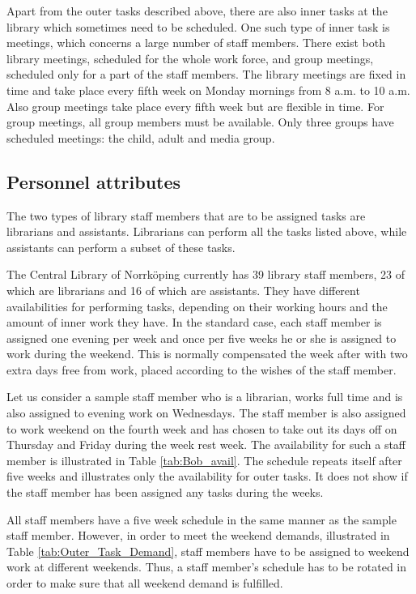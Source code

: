 Apart from the outer tasks described above, there are also inner tasks at the library which sometimes need to be scheduled. One such type of inner task is meetings, which concerns a large number of staff members. There exist both library meetings, scheduled for the whole work force, and group meetings, scheduled only for a part of the staff members. The library meetings are fixed in time and take place every fifth week on Monday mornings from 8 a.m. to 10 a.m. Also group meetings take place every fifth week but are flexible in time. For group meetings, all group members must be available. Only three groups have scheduled meetings: the child, adult and media group.

\subsection{Personnel attributes}

The two types of library staff members that are to be assigned tasks are librarians and assistants. Librarians can perform all the tasks listed above, while assistants can perform a subset of these tasks.

The Central Library of Norrköping currently has 39 library staff members, 23 of which are librarians and 16 of which are assistants. They have different availabilities for performing tasks, depending on their working hours and the amount of inner work they have. In the standard case, each staff member is assigned one evening per week and once per five weeks he or she is assigned to work during the weekend. This is normally compensated the week after with two extra days free from work, placed according to the wishes of the staff member.

Let us consider a sample staff member who is a librarian, works full time and is also assigned to evening work on Wednesdays. The staff member is also assigned to work weekend on the fourth week and has chosen to take out its days off on Thursday and Friday during the week rest week. The availability for such a staff member is illustrated in Table \ref{tab:Bob_avail}. The schedule repeats itself after five weeks and illustrates only the availability for outer tasks. It does not show if the staff member has been assigned any tasks during the weeks.

All staff members have a five week schedule in the same manner as the sample staff member. However, in order to meet the weekend demands, illustrated in Table \ref{tab:Outer_Task_Demand}, staff members have to be assigned to weekend work at different weekends. Thus, a staff member's schedule has to be rotated in order to make sure that all weekend demand is fulfilled.

